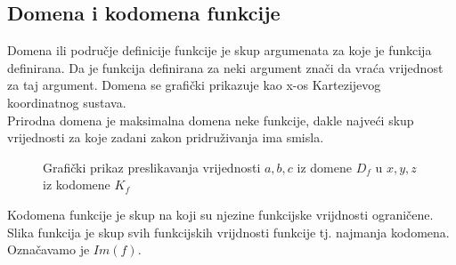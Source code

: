 \subsection{Domena i kodomena funkcije}
    Domena ili područje definicije funkcije je skup argumenata za koje je funkcija definirana.
    Da je funkcija definirana za neki argument znači da vraća vrijednost za taj argument.
    Domena se grafički prikazuje kao x-os Kartezijevog koordinatnog sustava. 
    \\
    Prirodna domena je maksimalna domena neke funkcije, dakle najveći skup vrijednosti za koje zadani zakon pridruživanja ima smisla.
    \begin{figure}[ht]
        \centering
        \caption{Grafički prikaz preslikavanja vrijednosti \(a, b, c\) iz domene \(D_f\) u \(x, y, z\) iz kodomene \(K_f\)} 
        \label{fig:template}
    \end{figure}
    Kodomena funkcije je skup na koji su njezine funkcijske vrijdnosti ograničene.
    Slika funkcija je skup svih funkcijskih vrijdnosti funkcije tj. najmanja kodomena. Označavamo je \(Im(f)\).
    
